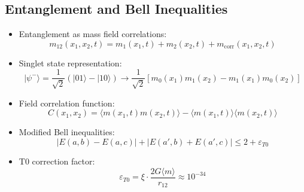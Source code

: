\documentclass[12pt,a4paper]{article}
\begin{document}
	\subsection{Entanglement and Bell Inequalities}
	\begin{itemize}
		\item Entanglement as mass field correlations:
		\begin{equation}
			m_{12}(x_1,x_2,t) = m_1(x_1,t) + m_2(x_2,t) + m_{\text{corr}}(x_1,x_2,t)
		\end{equation}
		
		\item Singlet state representation:
		\begin{equation}
			|\psi^-\rangle = \frac{1}{\sqrt{2}}(|01\rangle - |10\rangle) \rightarrow \frac{1}{\sqrt{2}}[m_0(x_1)m_1(x_2) - m_1(x_1)m_0(x_2)]
		\end{equation}
		
		\item Field correlation function:
		\begin{equation}
			C(x_1,x_2) = \langle m(x_1,t) m(x_2,t) \rangle - \langle m(x_1,t) \rangle \langle m(x_2,t) \rangle
		\end{equation}
		
		\item Modified Bell inequalities:
		\begin{equation}
			|E(a,b) - E(a,c)| + |E(a',b) + E(a',c)| \leq 2 + \varepsilon_{T0}
		\end{equation}
		
		\item T0 correction factor:
		\begin{equation}
			\varepsilon_{T0} = \xi \cdot \frac{2G\langle m \rangle}{r_{12}} \approx 10^{-34}
		\end{equation}
	\end{itemize}
	
\end{document}

